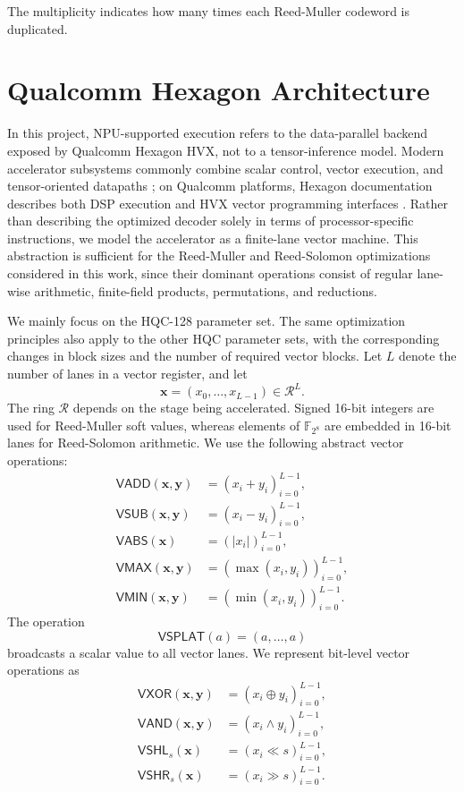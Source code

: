 \documentclass[12pt,a4paper]{report}
\begin{document}
\noindent
The multiplicity indicates how many times each Reed-Muller codeword is duplicated.

\section{Qualcomm Hexagon Architecture}
In this project, NPU-supported execution refers to the data-parallel backend exposed by Qualcomm Hexagon HVX, not to a tensor-inference model. Modern accelerator subsystems commonly combine scalar control, vector execution, and tensor-oriented datapaths \cite{chen2020,qualcomm-hexagon-npu}; on Qualcomm platforms, Hexagon documentation describes both DSP execution and HVX vector programming interfaces \cite{qualcomm-dsp,qualcomm-hvx}. Rather than describing the optimized decoder solely in terms of processor-specific instructions, we model the accelerator as a finite-lane vector machine. This abstraction is sufficient for the Reed-Muller and Reed-Solomon optimizations considered in this work, since their dominant operations consist of regular lane-wise arithmetic, finite-field products, permutations, and reductions.

We mainly focus on the HQC-128 parameter set. The same optimization principles also apply to the other HQC parameter sets, with the corresponding changes in block sizes and the number of required vector blocks. Let $L$ denote the number of lanes in a vector register, and let
\[
    \mathbf{x}=(x_0,\ldots,x_{L-1})\in\mathcal{R}^{L}.
\]
The ring $\mathcal{R}$ depends on the stage being accelerated. Signed 16-bit integers are used for Reed-Muller soft values, whereas elements of
$\mathbb{F}_{2^8}$ are embedded in 16-bit lanes for Reed-Solomon arithmetic. We use the following abstract vector operations:
\[
\begin{aligned}
\mathsf{VADD}(\mathbf{x},\mathbf{y}) &=(x_i+y_i)_{i=0}^{L-1},\\
\mathsf{VSUB}(\mathbf{x},\mathbf{y}) &=(x_i-y_i)_{i=0}^{L-1},\\
\mathsf{VABS}(\mathbf{x}) &=(|x_i|)_{i=0}^{L-1},\\
\mathsf{VMAX}(\mathbf{x},\mathbf{y}) &=(\max(x_i,y_i))_{i=0}^{L-1},\\
\mathsf{VMIN}(\mathbf{x},\mathbf{y}) &=(\min(x_i,y_i))_{i=0}^{L-1}.
\end{aligned}
\]
The operation
\[
    \mathsf{VSPLAT}(a)=(a,\ldots,a)
\]
broadcasts a scalar value to all vector lanes. We represent bit-level vector operations as
\[
\begin{aligned}
\mathsf{VXOR}(\mathbf{x},\mathbf{y}) &=(x_i\oplus y_i)_{i=0}^{L-1},\\
\mathsf{VAND}(\mathbf{x},\mathbf{y}) &=(x_i\wedge y_i)_{i=0}^{L-1},\\
\mathsf{VSHL}_{s}(\mathbf{x}) &=(x_i\ll s)_{i=0}^{L-1},\\
\mathsf{VSHR}_{s}(\mathbf{x}) &=(x_i\gg s)_{i=0}^{L-1}.
\end{aligned}
\]
\end{document}
